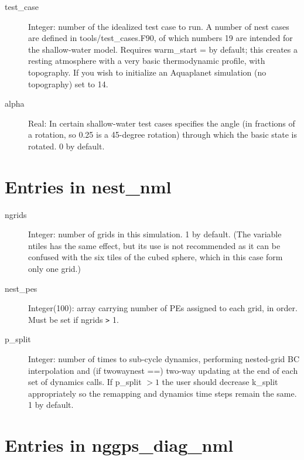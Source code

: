 \documentclass[12pt,letterpaper]{book}
\begin{document}
\begin{description}

\item[test\_case] Integer: number of the idealized test case to run. A number of nest cases are defined in tools/test\_cases.F90, of which numbers 
19 are intended for the shallow-water model. Requires warm\_start 
= by default; this creates a resting atmosphere with a very basic thermodynamic profile, with topography. If you wish to initialize an Aquaplanet simulation 
(no topography) set to 14. 


\item[alpha] Real: In certain shallow-water test cases specifies the angle 
(in fractions of a rotation, so 0.25 is a 45-degree rotation) through which the basic state is rotated. 
0 by default. 


\end{description}

\section{Entries in nest\_nml}

\begin{description}

\item[ngrids] Integer: number of grids in this simulation. 1 by default.  (The variable ntiles has the same effect, but its use is not recommended as it can be confused with the six tiles of the cubed sphere, which in this case form only one grid.)


\item[nest\_pes] Integer(100): array carrying number of PEs assigned to each grid, in order. Must be set if ngrids 
\texttt{>} 1. 


\item[p\_split] Integer: number of times to sub-cycle dynamics, performing nested-grid BC interpolation and 
(if twowaynest ==\true ) two-way updating at the end of each set of dynamics calls. If p\_split $ > 1$
 the user should decrease k\_split appropriately so the remapping and dynamics time steps remain the same. 
1 by default.


\end{description}

\section{Entries in nggps\_diag\_nml}
\end{document}
